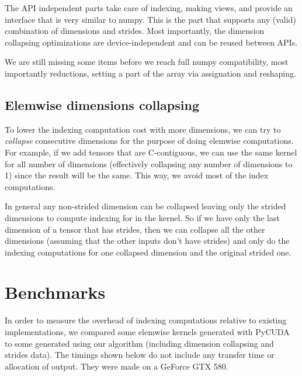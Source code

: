 \documentclass{article} %
\begin{document}
The API independent parts take care of indexing, making views, and provide an interface that is very similar to numpy.
This is the part that supports any (valid) combination of dimensions and strides.
Most importantly, the dimension collapsing optimizations are device-independent and can be reused between APIs.

We are still missing some items before we reach full numpy compatibility, most importantly reductions, setting a part of the array via assignation and reshaping.

\subsection{Elemwise dimensions collapsing}

To lower the indexing computation cost with more dimensions, we can try to \emph{collapse} consecutive dimensions for the purpose of doing elemwise computations.
For example, if we add tensors that are C-contiguous, we can use the same kernel for all number of dimensions (effectively collapsing any number of dimensions to 1) since the result will be the same.
This way,  we avoid most of the index computations.

In general any non-strided dimension can be collapsed leaving only the strided dimensions to compute indexing for in the kernel.
So if we have only the last dimension of a tensor that has strides, then we can collapse all the other dimensions (assuming that the other inputs don't have strides) and only do the indexing computations for one collapsed dimension and the original strided one.

\section{Benchmarks}

In order to measure the overhead of indexing computations relative to existing implementations, we compared some elemwise kernels generated with PyCUDA to some generated using our algorithm (including dimension collapsing and strides data).
The timings shown below do not include any transfer time or allocation of output.
They were made on a GeForce GTX 580.
\end{document}
